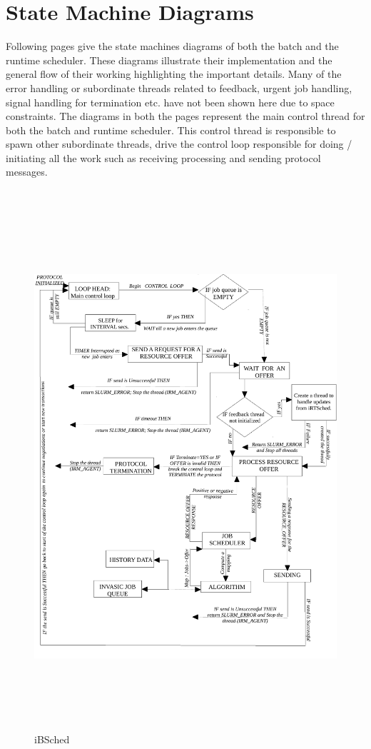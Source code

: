 \section{State Machine Diagrams}
Following pages give the state machines diagrams of both the batch and the runtime scheduler. These diagrams illustrate their implementation and the general flow of their working highlighting the important details. Many of the error handling or subordinate threads related to feedback, urgent job handling, signal handling for termination etc. have not been shown here due to space constraints. The diagrams in both the pages represent the main control thread for both the batch and runtime scheduler. This control thread is responsible to spawn other subordinate threads, drive the control loop responsible for doing / initiating all the work such as receiving processing and sending protocol messages.\\ \\
\begin{figure}[!htbp]
\hspace*{0.1in}
\centering
\includegraphics[width=1.0\textwidth, height=195mm]{./figures/iBSched.pdf}
\caption{iBSched}
\label{fig:Neg}
\end{figure}
